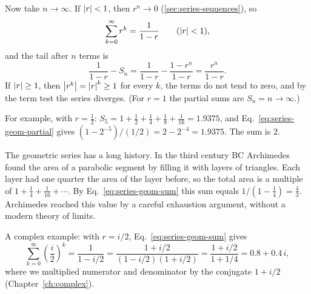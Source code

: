 Now take $n\to\infty$. If $\left\lvert r\right\rvert<1$, then $r^n\to0$ (\cref{sec:series-sequences}), so
\begin{equation}
\sum_{k=0}^{\infty}r^k=\frac{1}{1-r}\qquad(\left\lvert r\right\rvert<1),
\label{eq:series-geom-sum}
\end{equation}
and the tail after $n$ terms is
\begin{equation}
\frac{1}{1-r}-S_n=\frac{1}{1-r}-\frac{1-r^n}{1-r}=\frac{r^n}{1-r}.
\label{eq:series-geom-tail}
\end{equation}
If $\left\lvert r\right\rvert\ge1$, then $\left\lvert r^k\right\rvert=\left\lvert r\right\rvert^k\ge1$ for every $k$, the terms do not tend to zero, and by the term test the series diverges. (For $r=1$ the partial sums are $S_n=n\to\infty$.)

For example, with $r=\tfrac12$: $S_5=1+\tfrac12+\tfrac14+\tfrac18+\tfrac1{16}=1.9375$, and Eq.~\eqref{eq:series-geom-partial} gives $(1-2^{-5})/(1/2)=2-2^{-4}=1.9375$. The sum is $2$.

The geometric series has a long history. In the third century BC Archimedes found the area of a parabolic segment by filling it with layers of triangles. Each layer had one quarter the area of the layer before, so the total area is a multiple of $1+\tfrac14+\tfrac1{16}+\cdots$. By Eq.~\eqref{eq:series-geom-sum} this sum equals $1/(1-\tfrac14)=\tfrac43$. Archimedes reached this value by a careful exhaustion argument, without a modern theory of limits.

A complex example: with $r=i/2$, Eq.~\eqref{eq:series-geom-sum} gives
\[
\sum_{k=0}^\infty\left(\frac i2\right)^k=\frac{1}{1-i/2}=\frac{1+i/2}{(1-i/2)(1+i/2)}=\frac{1+i/2}{1+1/4}=0.8+0.4\,i,
\]
where we multiplied numerator and denominator by the conjugate $1+i/2$ (Chapter~\ref{ch:complex}).

